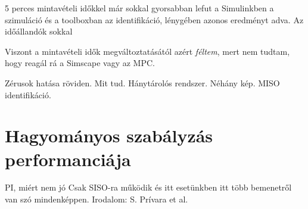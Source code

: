 5 perces mintavételi időkkel már sokkal gyorsabban lefut a Simulinkben a szimuláció és a toolboxban az identifikáció, lénygében azonos eredményt adva. Az időállandók sokkal 

Viszont a mintavételi idők megváltoztatásától azért \textit{féltem}, mert nem tudtam, hogy reagál rá a Simscape vagy az MPC.

Zérusok hatása röviden. Mit tud. Hánytárolós rendszer. Néhány kép.
MISO identifikáció. 


\section{Hagyományos szabályzás performanciája}

PI, miért nem jó
Csak SISO-ra működik és itt esetünkben itt több bemenetről van szó mindenképpen. Irodalom: S. Prívara et al. 



\pagebreak